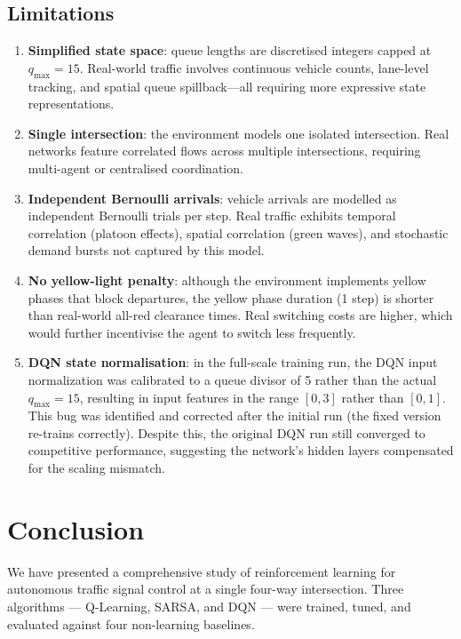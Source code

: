 \documentclass[12pt]{article}
\begin{document}
\subsection{Limitations}
\begin{enumerate}
    \item \textbf{Simplified state space}: queue lengths are discretised integers
          capped at $q_\text{max}=15$. Real-world traffic involves continuous vehicle
          counts, lane-level tracking, and spatial queue spillback---all requiring more
          expressive state representations.
    \item \textbf{Single intersection}: the environment models one isolated
          intersection. Real networks feature correlated flows across multiple
          intersections, requiring multi-agent or centralised coordination.
    \item \textbf{Independent Bernoulli arrivals}: vehicle arrivals are modelled as
          independent Bernoulli trials per step. Real traffic exhibits temporal
          correlation (platoon effects), spatial correlation (green waves), and
          stochastic demand bursts not captured by this model.
    \item \textbf{No yellow-light penalty}: although the environment implements yellow
          phases that block departures, the yellow phase duration (1 step) is shorter
          than real-world all-red clearance times. Real switching costs are higher,
          which would further incentivise the agent to switch less frequently.
    \item \textbf{DQN state normalisation}: in the full-scale training run, the DQN
          input normalization was calibrated to a queue divisor of 5 rather than the
          actual $q_\text{max}=15$, resulting in input features in the range $[0, 3]$
          rather than $[0, 1]$. This bug was identified and corrected after the initial
          run (the fixed version re-trains correctly). Despite this, the original DQN
          run still converged to competitive performance, suggesting the network's
          hidden layers compensated for the scaling mismatch.
\end{enumerate}

\section{Conclusion}
We have presented a comprehensive study of reinforcement learning for autonomous
traffic signal control at a single four-way intersection. Three algorithms --- Q-Learning,
SARSA, and DQN --- were trained, tuned, and evaluated against four non-learning
baselines.
\end{document}

